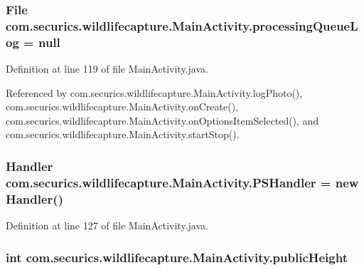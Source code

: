 \subsubsection[{processing\+Queue\+Log}]{\setlength{\rightskip}{0pt plus 5cm}File com.\+securics.\+wildlifecapture.\+Main\+Activity.\+processing\+Queue\+Log = null}\label{classcom_1_1securics_1_1wildlifecapture_1_1_main_activity_a91f58acd4aee3e5e863cad05e125e6b5}


Definition at line 119 of file Main\+Activity.\+java.



Referenced by com.\+securics.\+wildlifecapture.\+Main\+Activity.\+log\+Photo(), com.\+securics.\+wildlifecapture.\+Main\+Activity.\+on\+Create(), com.\+securics.\+wildlifecapture.\+Main\+Activity.\+on\+Options\+Item\+Selected(), and com.\+securics.\+wildlifecapture.\+Main\+Activity.\+start\+Stop().

\subsubsection[{P\+S\+Handler}]{\setlength{\rightskip}{0pt plus 5cm}Handler com.\+securics.\+wildlifecapture.\+Main\+Activity.\+P\+S\+Handler = new Handler()\hspace{0.3cm}{\ttfamily [private]}}\label{classcom_1_1securics_1_1wildlifecapture_1_1_main_activity_ac26217ffabb287c0dd73c93e4b482c0c}


Definition at line 127 of file Main\+Activity.\+java.

\subsubsection[{public\+Height}]{\setlength{\rightskip}{0pt plus 5cm}int com.\+securics.\+wildlifecapture.\+Main\+Activity.\+public\+Height\hspace{0.3cm}{\ttfamily [static]}}\label{classcom_1_1securics_1_1wildlifecapture_1_1_main_activity_a43ab48591bfbc4722021467b4ffcb470}



